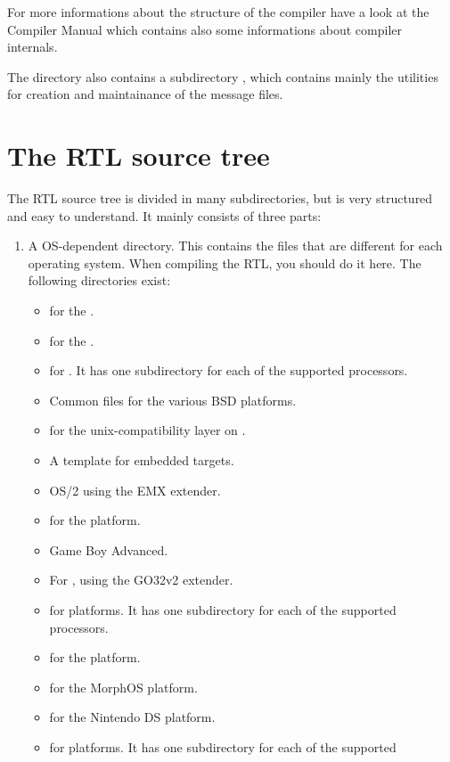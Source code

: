 For more informations about the structure of the compiler have a look at the
Compiler Manual which contains also some informations about
compiler internals.

The  directory also contains a subdirectory ,
which contains mainly the utilities for creation and maintainance of the
message files.

\section{The RTL source tree}
The RTL source tree is divided in many subdirectories, but is very
structured and easy to understand. It mainly consists of three parts:

\begin{enumerate}
\item A OS-dependent directory. This contains the files that are different for
each operating system. When compiling the RTL, you should do it here. The
following directories exist:
\begin{itemize}
\item {} for the \amiga.
\item {} for the \atari.
\item {}  for \beos. 
It has one subdirectory for each of the supported processors.
\item {} Common files for the various BSD platforms.
\item {} for the unix-compatibility layer on \macos.
\item {} A template for embedded targets.
\item {} OS/2 using the EMX extender.
\item {} for the \freebsd platform.
\item {} Game Boy Advanced.
\item {} For \dos, using the GO32v2 extender.
\item {} for \linux platforms. It has one subdirectory for each of the supported
processors.
\item {} for the \macos platform. 
\item {} for the MorphOS platform. 
\item {} for the Nintendo DS platform.
\item {} for \netbsd platforms. It has one subdirectory for each of the supported

\end{itemize}
\end{enumerate}

